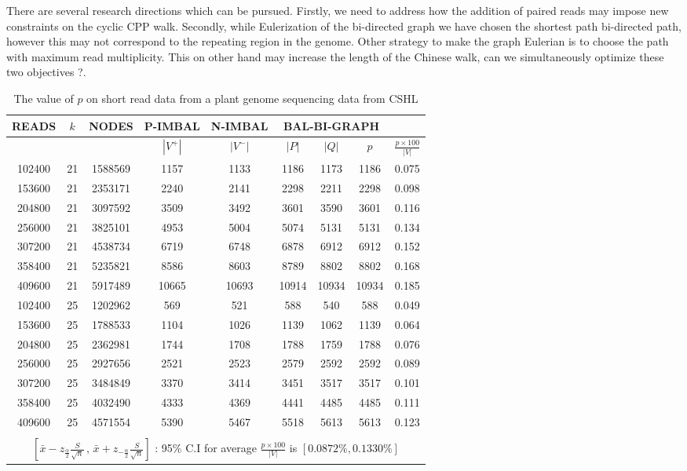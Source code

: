 \documentclass[runningheads]{llncs}
\begin{document}
There are several research directions which can be pursued. Firstly, we need to address how the addition of
paired reads may impose new constraints on the cyclic CPP walk. Secondly, while Eulerization of the bi-directed graph
we have chosen the shortest path bi-directed path, however this may not correspond to the repeating region in 
the genome. Other strategy to make the graph Eulerian is to choose the path with maximum read multiplicity. 
This on other hand may increase the length of the Chinese walk, can we simultaneously optimize these two 
objectives ?.


\begin{table}
\begin{center}
\begin{tabular}{|c|c|c|c|c|c|c|c|c|}
\hline
READS &  $k$ & NODES & P-IMBAL & N-IMBAL & \multicolumn{3}{|c|}{BAL-BI-GRAPH} & \\
\hline
 &&&$|V^+|$&$|V^-|$&$|P|$ & $|Q|$ & $p$ & $\frac{p\times 100}{|V|}$ \\
\hline
102400 & 21 & 1588569 & 1157 & 1133 & 1186 & 1173 & 1186 & 0.075 \\ 
\hline
153600 & 21 & 2353171 & 2240 & 2141 & 2298 & 2211 & 2298 & 0.098 \\ 
\hline
204800 & 21 & 3097592 & 3509 & 3492 & 3601 & 3590 & 3601 & 0.116 \\ 
\hline
256000 & 21 & 3825101 & 4953 & 5004 & 5074 & 5131 & 5131 & 0.134 \\ 
\hline
307200 & 21 & 4538734 & 6719 & 6748 & 6878 & 6912 & 6912 & 0.152 \\ 
\hline
358400 & 21 & 5235821 & 8586 & 8603 & 8789 & 8802 & 8802 & 0.168 \\ 
\hline
409600 & 21 & 5917489 & 10665 & 10693 & 10914 & 10934 & 10934 & 0.185 \\ 
\hline
102400 & 25 & 1202962 & 569 & 521 & 588 & 540 & 588 & 0.049 \\ 
\hline
153600 & 25 & 1788533 & 1104 & 1026 & 1139 & 1062 & 1139 & 0.064 \\ 
\hline
204800 & 25 & 2362981 & 1744 & 1708 & 1788 & 1759 & 1788 & 0.076 \\ 
\hline
256000 & 25 & 2927656 & 2521 & 2523 & 2579 & 2592 & 2592 & 0.089 \\ 
\hline
307200 & 25 & 3484849 & 3370 & 3414 & 3451 & 3517 & 3517 & 0.101 \\ 
\hline
358400 & 25 & 4032490 & 4333 & 4369 & 4441 & 4485 & 4485 & 0.111 \\ 
\hline
409600 & 25 & 4571554 & 5390 & 5467 & 5518 & 5613 & 5613 & 0.123 \\ 
\hline
\multicolumn{9}{|c|}{}\\ 
 \multicolumn{9}{|c|}{$\left[\bar{x}-z_{\frac{\alpha}{2}}\frac{S}{\sqrt{n}}\,,\,\bar{x}+z_{-\frac{\alpha}{2}}\frac{S}{\sqrt{n}} \right]$ :  95\% C.I for average $\frac{p\times 100}{|V|}$ is $[0.0872\%,0.1330\%]$} \\ 
\hline
\end{tabular}
 \end{center}
\caption{The value of $p$ on short read data from a plant genome sequencing data from CSHL}
\label{tab:imbal}
\end{table}
\end{document}
